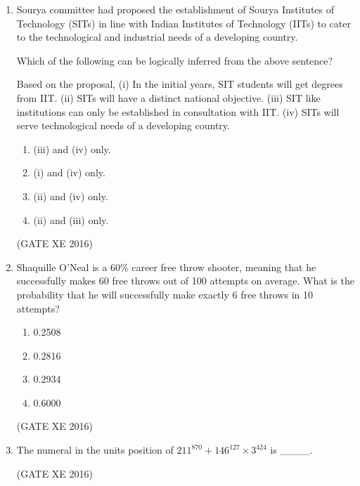 \documentclass[12pt]{article}
\begin{document}
\begin{enumerate}
\begin{enumerate}
    \item Many students have misconceptions regarding various engineering disciplines. 
    \item Men with advanced degrees in mechanical engineering believe women are well suited to be mechanical engineers. 
    \item Mechanical engineering is a profession well suited for women with masters or higher degrees in mechanical engineering. 
    \item The number of women pursuing higher degrees in mechanical engineering is small.
\end{enumerate}
(GATE XE 2016)

\item Sourya committee had proposed the establishment of Sourya Institutes of Technology (SITs) in line with Indian Institutes of Technology (IITs) to cater to the technological and industrial needs of a developing country.  

Which of the following can be logically inferred from the above sentence?  

Based on the proposal,  
(i) In the initial years, SIT students will get degrees from IIT.  
(ii) SITs will have a distinct national objective.  
(iii) SIT like institutions can only be established in consultation with IIT.  
(iv) SITs will serve technological needs of a developing country.  

\begin{multicols}{2}
\begin{enumerate}
    \item (iii) and (iv) only. 
    \item (i) and (iv) only. 
    \item (ii) and (iv) only. 
    \item (ii) and (iii) only. 
\end{enumerate}
\end{multicols}

(GATE XE 2016)  

\item Shaquille O'Neal is a 60\% career free throw shooter, meaning that he successfully makes 60 free throws out of 100 attempts on average. What is the probability that he will successfully make exactly 6 free throws in 10 attempts?  

\begin{multicols}{4}
\begin{enumerate}
    \item 0.2508
    \item 0.2816
    \item 0.2934
    \item 0.6000
\end{enumerate}
\end{multicols}

(GATE XE 2016)  

\item The numeral in the units position of $211^{870} + 146^{127} \times 3^{424}$ is \_\_\_\_. 

(GATE XE 2016)
\end{enumerate}
\end{document}
